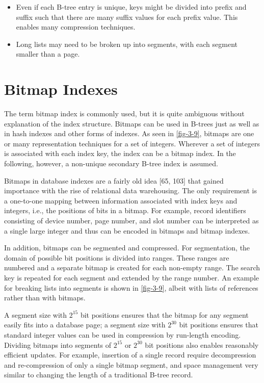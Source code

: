 \begin{itemize}
\item
  Even if each B-tree entry is unique, keys might be divided into prefix
  and suffix such that there are many suffix values for each prefix
  value. This enables many compression techniques.
\item
  Long lists may need to be broken up into segments, with each segment
  smaller than a page.
\end{itemize}

\hypertarget{bitmap-indexes}{%
\section{Bitmap Indexes}\label{bitmap-indexes}}

The term bitmap index is commonly used, but it is quite ambiguous
without explanation of the index structure. Bitmaps can be used in
B-trees just as well as in hash indexes and other forms of indexes. As
seen in \autoref{fig-3-9}, bitmaps are one or many representation techniques
for a set of integers. Wherever a set of integers is associated with
each index key, the index can be a bitmap index. In the following,
however, a non-unique secondary B-tree index is assumed.

Bitmaps in database indexes are a fairly old idea {[}65, 103{]} that
gained importance with the rise of relational data warehousing. The only
requirement is a one-to-one mapping between information associated with
index keys and integers, i.e., the positions of bits in a bitmap. For
example, record identifiers consisting of device number, page number,
and slot number can be interpreted as a single large integer and thus
can be encoded in bitmaps and bitmap indexes.

In addition, bitmaps can be segmented and compressed. For segmentation,
the domain of possible bit positions is divided into ranges. These
ranges are numbered and a separate bitmap is created for each non-empty
range. The search key is repeated for each segment and extended by the
range number. An example for breaking lists into segments is shown in
\autoref{fig-3-9}, albeit with lists of references rather than with bitmaps.

A segment size with $2^15$ bit positions ensures that the
bitmap for any segment easily fits into a database page; a segment size
with $2^30$ bit positions ensures that standard integer
values can be used in compression by run-length encoding. Dividing
bitmaps into segments of $2^15$ or $2^30$
bit positions also enables reasonably efficient updates. For example,
insertion of a single record require decompression and re-compression of
only a single bitmap segment, and space management very similar to
changing the length of a traditional B-tree record.

